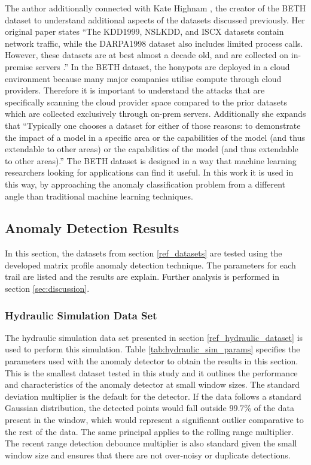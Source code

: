 The author additionally connected with Kate Highnam \parencite{Highnam-email:private}, the creator of the BETH dataset to understand additional aspects of the datasets discussed previously. Her original paper states ``The KDD1999, NSLKDD, and ISCX datasets contain network traffic, while the DARPA1998 dataset also includes limited process calls. However, these datasets are at best almost a decade old, and are collected on in-premise servers \parencite{beth-dataset}.'' In the BETH dataset, the honypots are deployed in a cloud environment because many major companies utilise compute through cloud providers. Therefore it is important to understand the attacks that are specifically scanning the cloud provider space compared to the prior datasets which are collected exclusively through on-prem servers. Additionally she expands that ``Typically one chooses a dataset for either of those reasons: to demonstrate the impact of a model in a specific area or the capabilities of the model (and thus extendable to other areas)  or the capabilities of the model (and thus extendable to other areas).'' The BETH dataset is designed in a way that machine learning researchers looking for applications can find it useful. In this work it is used in this way, by approaching the anomaly classification problem from a different angle than traditional machine learning techniques.

\subsection{Anomaly Detection Results}

In this section, the datasets from section \ref{ref_datasets} are tested using the developed matrix profile anomaly detection technique. The parameters for each trail are listed and the results are explain. Further analysis is performed in section \ref{sec:discussion}.

\subsubsection{Hydraulic Simulation Data Set}
\label{ref_results_hydraulic_sim}
The hydraulic simulation data set presented in section \ref{ref_hydraulic_dataset} is used to perform this simulation. Table \ref{tab:hydraulic_sim_params} specifies the parameters used with the anomaly detector to obtain the results in this section. This is the smallest dataset tested in this study and it outlines the performance and characteristics of the anomaly detector at small window sizes. The standard deviation multiplier is the default for the detector. If the data follows a standard Gaussian distribution, the detected points would fall outside 99.7\% of the data present in the window, which would represent a significant outlier comparative to the rest of the data. The same principal applies to the rolling range multiplier. The recent range detection debounce multiplier is also standard given the small window size and ensures that there are not over-noisy or duplicate detections.

